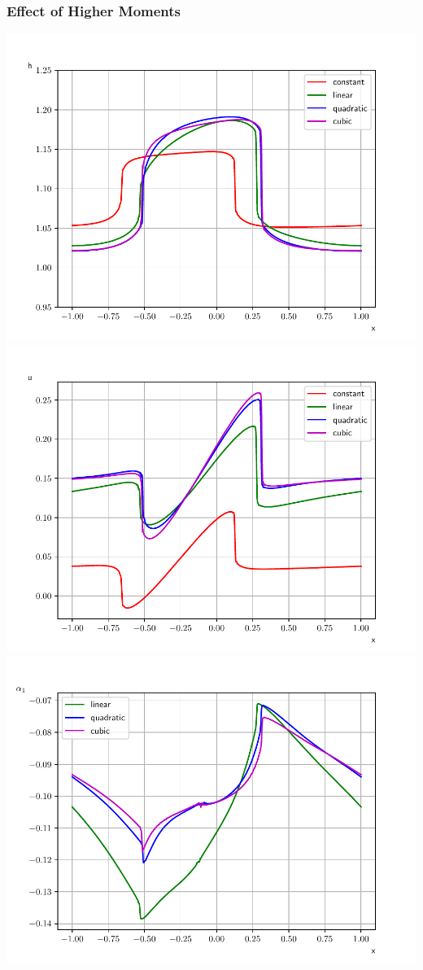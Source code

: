 \documentclass[10pt]{beamer}
\begin{document}
\begin{frame}
  \frametitle{Effect of Higher Moments}
  \centering
  \includegraphics[scale=0.29]{Figures/height_torillhon.pdf}
  \includegraphics[scale=0.29]{Figures/mean_velocity_torrilhon.pdf}
  \includegraphics[scale=0.29]{Figures/alpha_1_torrilhon.pdf}

\end{frame}
\end{document}
